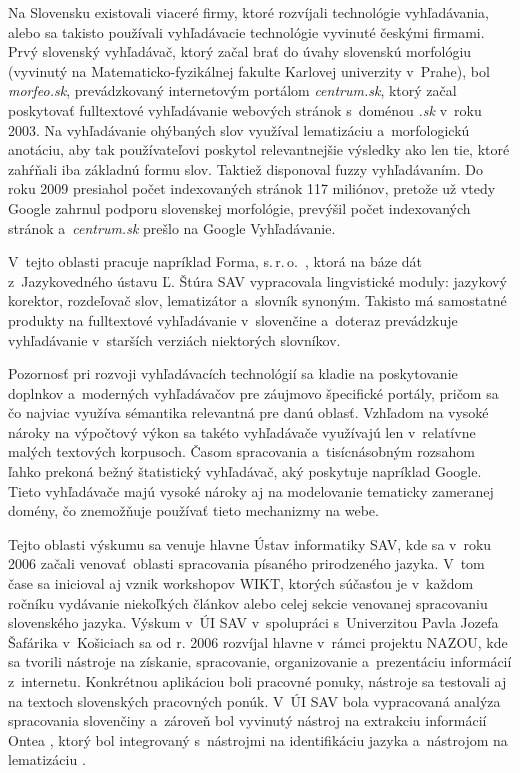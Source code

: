 \begin{multicols}{2}
Na Slovensku existovali viaceré firmy, ktoré rozvíjali
technológie vyhľadávania, alebo sa takisto používali vyhľadávacie technológie
vyvinuté českými firmami. Prvý slovenský vyhľadávač, ktorý začal brať
do úvahy slovenskú morfológiu (vyvinutý na Matematicko-fyzikálnej
fakulte Karlovej univerzity v~Prahe), bol \emph{morfeo.sk}, prevádzkovaný
internetovým portálom \emph{centrum.sk}, ktorý začal poskytovať fulltextové
vyhľadávanie webových stránok s~doménou \emph{.sk} v~roku 2003. Na vyhľadávanie
ohýbaných slov využíval lematizáciu a~morfologickú anotáciu, aby tak
používateľovi poskytol relevantnejšie výsledky ako len tie, ktoré zahŕňali iba
základnú formu slov. Taktiež disponoval fuzzy vyhľadávaním. Do roku 2009 presiahol počet
indexovaných stránok 117 miliónov, pretože už vtedy Google zahrnul podporu
slovenskej morfológie, prevýšil počet indexovaných stránok a~\emph{centrum.sk}
prešlo na Google Vyhľadávanie.

V~tejto oblasti pracuje napríklad Forma, s.\,r.\,o.~\cite{f25}, ktorá na báze dát z~Jazykovedného ústavu Ľ. Štúra SAV vypracovala lingvistické moduly: jazykový korektor, rozdeľovač slov, lematizátor a~slovník synoným. Takisto má samostatné produkty na fulltextové vyhľadávanie v~slovenčine a~doteraz prevádzkuje vyhľadávanie v~starších verziách niektorých slovníkov.

Pozornosť pri rozvoji vyhľadávacích technológií sa kladie na poskytovanie doplnkov a~moderných vyhľadávačov pre záujmovo špecifické portály, pričom sa čo najviac využíva sémantika relevantná pre danú oblasť. Vzhľadom na vysoké nároky na výpočtový výkon sa takéto vyhľadávače využívajú len v~relatívne malých textových korpusoch. Časom spracovania a~tisícnásobným rozsahom ľahko prekoná bežný štatistický vyhľadávač, aký poskytuje napríklad Google. Tieto vyhľadávače majú vysoké nároky aj na modelovanie tematicky zameranej domény, čo znemožňuje používať tieto mechanizmy na webe. 

Tejto oblasti výskumu sa venuje hlavne Ústav informatiky SAV, kde sa v~roku 2006 začali venovať~oblasti spracovania písaného prirodzeného jazyka. V~tom čase sa inicioval aj vznik workshopov WIKT\cite{f26}, ktorých súčasťou je v~každom ročníku vydávanie niekoľkých článkov alebo celej sekcie venovanej spracovaniu slovenského jazyka. Výskum v~ÚI SAV v~spolupráci s~Univerzitou Pavla Jozefa Šafárika v~Košiciach sa od r. 2006 rozvíjal hlavne v~rámci projektu NAZOU\cite{f27}, kde sa tvorili nástroje na získanie, spracovanie, organizovanie a~prezentáciu informácií z~internetu. Konkrétnou aplikáciou boli pracovné ponuky, nástroje sa testovali aj na textoch slovenských pracovných ponúk. V~ÚI SAV bola vypracovaná analýza spracovania slovenčiny \cite{laclavik2007a} a~zároveň bol vyvinutý nástroj na extrakciu informácií Ontea\cite{f28} \cite{laclavik2007b,laclavik2009}, ktorý bol integrovaný s~nástrojmi na identifikáciu jazyka \cite{vojtek2006} a~nástrojom na lematizáciu \cite{krajci2007}.


\end{multicols}
